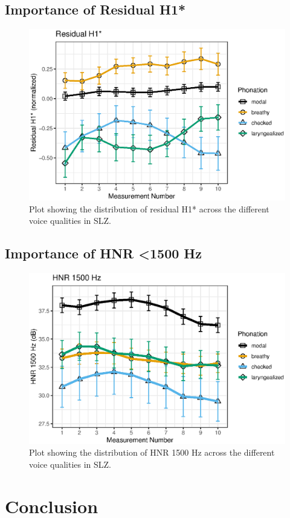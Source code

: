 \subsection{Importance of Residual H1*} \label{sec:bagging_residual}
\begin{figure}[!ht]
    \centering
    \includegraphics[width = 0.9\linewidth]{images/slz_residual_h1c.eps}
    \caption{Plot showing the distribution of residual H1* across the different voice qualities in SLZ.}
    \label{fig:residualH1}
\end{figure}

\subsection{Importance of HNR \textless 1500 Hz} \label{sec:bagging_hnr}

\begin{figure}[!ht]
    \centering
    \includegraphics[width = 0.9\linewidth]{images/slz_hnr15.eps}
    \caption{Plot showing the distribution of HNR 1500 Hz across the different voice qualities in SLZ.}
    \label{fig:hnr1500}
\end{figure}

\section{Conclusion} \label{sec:bagging_conclusion}


